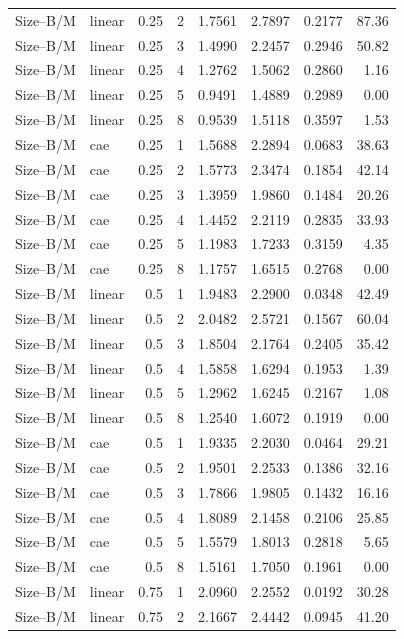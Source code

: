 \begin{longtable}{llrrrrrr}
Size--B/M & linear & 0.25 & 2 & 1.7561 & 2.7897 & 0.2177 & 87.36 \\
Size--B/M & linear & 0.25 & 3 & 1.4990 & 2.2457 & 0.2946 & 50.82 \\
Size--B/M & linear & 0.25 & 4 & 1.2762 & 1.5062 & 0.2860 & 1.16 \\
Size--B/M & linear & 0.25 & 5 & 0.9491 & 1.4889 & 0.2989 & 0.00 \\
Size--B/M & linear & 0.25 & 8 & 0.9539 & 1.5118 & 0.3597 & 1.53 \\
Size--B/M & cae & 0.25 & 1 & 1.5688 & 2.2894 & 0.0683 & 38.63 \\
Size--B/M & cae & 0.25 & 2 & 1.5773 & 2.3474 & 0.1854 & 42.14 \\
Size--B/M & cae & 0.25 & 3 & 1.3959 & 1.9860 & 0.1484 & 20.26 \\
Size--B/M & cae & 0.25 & 4 & 1.4452 & 2.2119 & 0.2835 & 33.93 \\
Size--B/M & cae & 0.25 & 5 & 1.1983 & 1.7233 & 0.3159 & 4.35 \\
Size--B/M & cae & 0.25 & 8 & 1.1757 & 1.6515 & 0.2768 & 0.00 \\
Size--B/M & linear & 0.5 & 1 & 1.9483 & 2.2900 & 0.0348 & 42.49 \\
Size--B/M & linear & 0.5 & 2 & 2.0482 & 2.5721 & 0.1567 & 60.04 \\
Size--B/M & linear & 0.5 & 3 & 1.8504 & 2.1764 & 0.2405 & 35.42 \\
Size--B/M & linear & 0.5 & 4 & 1.5858 & 1.6294 & 0.1953 & 1.39 \\
Size--B/M & linear & 0.5 & 5 & 1.2962 & 1.6245 & 0.2167 & 1.08 \\
Size--B/M & linear & 0.5 & 8 & 1.2540 & 1.6072 & 0.1919 & 0.00 \\
Size--B/M & cae & 0.5 & 1 & 1.9335 & 2.2030 & 0.0464 & 29.21 \\
Size--B/M & cae & 0.5 & 2 & 1.9501 & 2.2533 & 0.1386 & 32.16 \\
Size--B/M & cae & 0.5 & 3 & 1.7866 & 1.9805 & 0.1432 & 16.16 \\
Size--B/M & cae & 0.5 & 4 & 1.8089 & 2.1458 & 0.2106 & 25.85 \\
Size--B/M & cae & 0.5 & 5 & 1.5579 & 1.8013 & 0.2818 & 5.65 \\
Size--B/M & cae & 0.5 & 8 & 1.5161 & 1.7050 & 0.1961 & 0.00 \\
Size--B/M & linear & 0.75 & 1 & 2.0960 & 2.2552 & 0.0192 & 30.28 \\
Size--B/M & linear & 0.75 & 2 & 2.1667 & 2.4442 & 0.0945 & 41.20 \\

\end{longtable}
